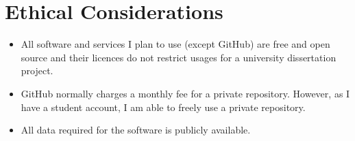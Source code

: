 \documentclass{article}
\begin{document}
	
	
	\section{Ethical Considerations}
	\begin{itemize}
		\item All software and services I plan to use (except GitHub) are free and open source and their licences do not restrict usages for a university dissertation project.
		\item GitHub normally charges a monthly fee for a private repository. However, as I have a student account, I am able to freely use a private repository.
		\item All data required for the software is publicly available.
	\end{itemize}
	
	
	
\end{document}
